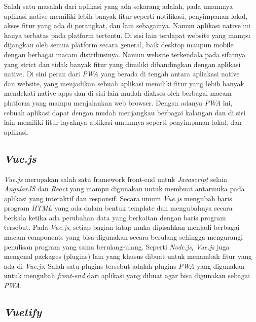 Salah satu masalah dari aplikasi yang ada sekarang adalah, pada umumnya aplikasi native memiliki lebih banyak fitur seperti notifikasi, penyimpanan lokal, akses fitur yang ada di perangkat, dan lain sebagainya.
Namun aplikasi native ini hanya terbatas pada platform tertentu.
Di sisi lain terdapat website yang mampu dijangkau oleh semua platform secara general, baik desktop maupun mobile dengan berbagai macam distribusinya.
Namun website terkendala pada sifatnya yang strict dan tidak banyak fitur yang dimiliki dibandingkan dengan aplikasi native.
Di sini peran dari \emph{PWA} yang berada di tengah antara apliakasi native dan website, yang menjadikan sebuah aplikasi memiliki fitur yang lebih banyak mendekati native apps dan di sisi lain mudah diakses oleh berbagai macam platform yang mampu menjalankan web browser.
Dengan adanya \emph{PWA} ini, sebuah aplikasi dapat dengan mudah menjangkau berbagai kalangan dan di sisi lain memiliki fitur layaknya aplikasi umumnya seperti penyimpanan lokal, dan aplikasi.
\vspace{0.5ex}

\subsection{\emph{Vue.js}}
\vspace{1ex}

\emph{Vue.js} merupakan salah satu framework front-end untuk \emph{Javascript} selain \emph{AngularJS} dan \emph{React} yang mampu digunakan untuk membuat antarmuka pada aplikasi yang interaktif dan responsif.
Secara umum \emph{Vue.js} mengubah baris program \emph{HTML} yang ada dalam bentuk template dan mengubahnya secara berkala ketika ada perubahan data yang berkaitan dengan baris program tersebut.
Pada \emph{Vue.js}, setiap bagian tatap muka dipisahkan menjadi berbagai macam components yang bisa digunakan secara berulang sehingga mengurangi penulisan program yang sama berulang-ulang.
Seperti \emph{Node.js}, \emph{Vue.js} juga mengenal packages (plugins) lain yang khusus dibuat untuk menambah fitur yang ada di \emph{Vue.js}.
Salah satu plugins tersebut adalah plugins \emph{PWA} yang digunakan untuk mengubah \emph{front-end} dari aplikasi yang dibuat agar bisa digunakan sebagai \emph{PWA}.
\vspace{0.5ex}

\subsection{\emph{Vuetify}}
\vspace{1ex}

